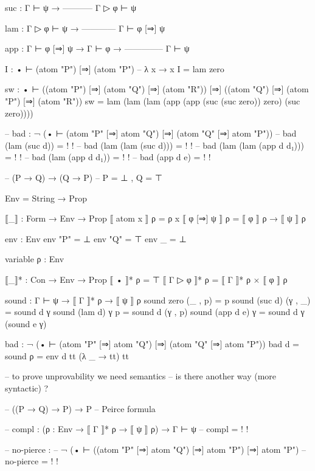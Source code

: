     suc : Γ ⊢ ψ →
          -----------
          Γ ▷ φ ⊢ ψ

    lam : Γ ▷ φ ⊢ ψ →
          ------------
          Γ ⊢ φ [⇒] ψ

    app : Γ ⊢ φ [⇒] ψ → 
          Γ ⊢ φ →
          --------------
          Γ ⊢ ψ 

I : • ⊢ (atom "P") [⇒] (atom "P")
-- λ x → x
I = lam zero

sw : • ⊢ ((atom "P") [⇒] (atom "Q") [⇒] (atom "R"))
         [⇒] ((atom "Q") [⇒] (atom "P") [⇒] (atom "R"))
sw = lam (lam (lam (app (app (suc (suc zero)) zero) (suc zero))))
    
-- bad : ¬ (• ⊢ (atom "P" [⇒] atom "Q") [⇒] (atom "Q" [⇒] atom "P"))
-- bad (lam (suc d)) = {!   !}
-- bad (lam (lam (suc d))) = {!   !}
-- bad (lam (lam (app d d₁))) = {!   !}
-- bad (lam (app d d₁)) = {!   !}
-- bad (app d e) = {!   !}

-- (P → Q) → (Q → P)
-- P = ⊥ , Q = ⊤ 

Env = String → Prop

⟦_⟧ : Form → Env → Prop
⟦ atom x ⟧ ρ = ρ x
⟦ φ [⇒] ψ ⟧ ρ = ⟦ φ ⟧ ρ → ⟦ ψ ⟧ ρ

env : Env 
env "P" = ⊥
env "Q" = ⊤
env _ = ⊥

variable ρ : Env

⟦_⟧* : Con → Env → Prop
⟦ • ⟧* ρ = ⊤
⟦ Γ ▷ φ ⟧* ρ = ⟦ Γ ⟧* ρ × ⟦ φ ⟧ ρ

sound : Γ ⊢ ψ → ⟦ Γ ⟧* ρ → ⟦ ψ ⟧ ρ
sound zero (_ , p) = p
sound (suc d) (γ , _) = sound d γ
sound (lam d) γ p = sound d (γ , p)
sound (app d e) γ = sound d γ (sound e γ)

bad : ¬ (• ⊢ (atom "P" [⇒] atom "Q") [⇒] (atom "Q" [⇒] atom "P"))
bad d = sound {ρ = env} d tt (λ _ → tt) tt

-- to prove unprovability we need semantics 
-- is there another way (more syntactic) ?

-- ((P → Q) → P) → P
-- Peirce formula

-- compl : ({ρ : Env} → ⟦ Γ ⟧* ρ → ⟦ ψ ⟧ ρ) → Γ ⊢ ψ 
-- compl = {!   !}

-- no-pierce : 
--    ¬ (• ⊢ ((atom "P" [⇒] atom "Q") [⇒] atom "P") [⇒] atom "P")
-- no-pierce = {!   !}